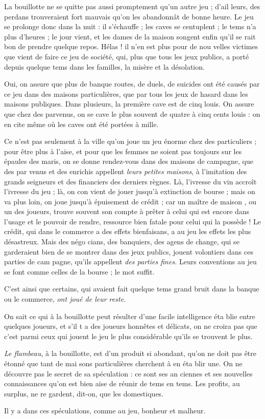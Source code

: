 La bouillotte ne se quitte pas aussi
promptement qu'un autre jeu ; d'ail%
leurs, des perdans trouveraient fort
mauvais qu'on les abandonnât de 
bonne heure. Le jeu se prolonge
donc dans la nuit : il s'échauffe ; les
caves se centuplent ; le tems n'a plus
d'heures ; le jour vient, et les dames
de la maison songent enfin qu'il se%
rait bon de prendre quelque repos.
Hélas ! il n'en est plus pour de nou%
velles victimes que vient de faire ce
jeu de société, qui, plus que tous les
jeux publics, a porté depuis quelque
tems dans les familles, la misère et
la désolation.

Oui, on assure que plus de banque%
routes, de duels, de suicides ont été
causés par ce jeu dans des maisons
particulières, que par tous les jeux
de hasard dans les maisons publiques.
Dans plusieurs, la première cave est
de cinq louis. On assure que chez des
parvenus, on se cave le plus souvent
de quatre à cinq cents louis : on en
cite même où les caves ont été portées
à mille.

Ce n'est pas seulement à la ville
qu'on joue un jeu énorme chez des
particuliers ; pour être plus à l'aise,
et pour que les femmes ne soient pas
toujours sur les épaules des maris,
on se donne rendez-vous dans des
maisons de campagne, que des par%
venus et des enrichis appellent \emph{leurs
petites maisons}, à l'imitation des 
grands seigneurs et des financiers des
derniers règnes. Là, l'ivresse du vin
accroît l'ivresse du jeu ; là, on con%
vient de jouer jusqu'à extinction de
bourse ; mais on va plus loin, on joue
jusqu'à épuisement de crédit ; car un
maître de maison , ou un des joueurs,
trouve souvent son compte à prêter
à celui qui est encore dans l'usage et
le pouvoir de rendre, ressource bien
fatale pour celui qui la possède ! Le 
crédit, qui dans le commerce a des
effets bienfaisans, a au jeu les effets
les plus désastreux. Mais des négo%
cians, des banquiers, des agens de
change, qui se garderaient bien de se
montrer dans des jeux publics, jouent
volontiers dans ces parties de cam%
pagne, qu'ils appellent \emph{des parties
fines.} Leurs conventions au jeu se
font comme celles de la bourse ; le
mot suffit.

C'est ainsi que certains, qui avaient
fait quelque tems grand bruit dans la
banque ou le commerce, \emph{ont joué de
leur reste.}

On sait ce qui à la bouillotte peut
résulter d'une facile intelligence éta%
blie entre quelques joueurs, et s'il t
a des joueurs honnêtes et délicats, on
ne croira pas que c'est parmi ceux
qui jouent le jeu le plus considérable
qu'ils se trouvent le plus.

\emph{Le flambeau}, à la bouillotte, est
d'un produit si abondant, qu'on ne
doit pas être étonné que tant de mai%
sons particulières cherchent à en éta%
blir une. On ne découvre pas le secret
de sa spéculation : ce sont ses an%
ciennes et ses nouvelles connaissances
qu'on est bien aise de réunir de tems
en tems. Les profits, au surplus, ne re%
gardent, dit-on, que les domestiques.

Il y a dans ces spéculations, comme
au jeu, bonheur et malheur.
